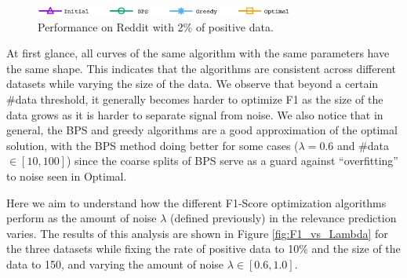\begin{figure}[H]
\begin{centering}
\includegraphics[width=8.5cm]{imgs/legend1}
\par\end{centering}
\begin{centering}
\par\end{centering}
\caption{Performance on Reddit with 2\% of positive data.}
\label{fig:F1_vs_Data_Reddit}
\end{figure}

At first glance, all curves of the same algorithm with the same parameters have the same shape. This indicates that the algorithms are consistent across different datasets while varying the size of the data. 
We observe that beyond a certain \#data threshold, it generally becomes harder to optimize F1 as the size of the data grows as it is harder to separate signal from noise.
We also notice that in general, the BPS and greedy algorithms are a good approximation of the optimal solution, with the BPS method doing better for some cases ($\lambda=0.6$ and \#data$\in [10,100]$) since the coarse splits of BPS serve as a guard against ``overfitting'' to noise seen in Optimal.


  Here we aim to understand how the different F1-Score optimization algorithms perform as the amount of noise $\lambda$ (defined previously) in the relevance prediction varies.
The results of this analysis are shown in Figure \ref{fig:F1_vs_Lambda} for the three datasets while fixing the rate of positive data to 10\% and the size of the data to 150, and varying the amount of noise $\lambda \in [0.6,1.0]$.

